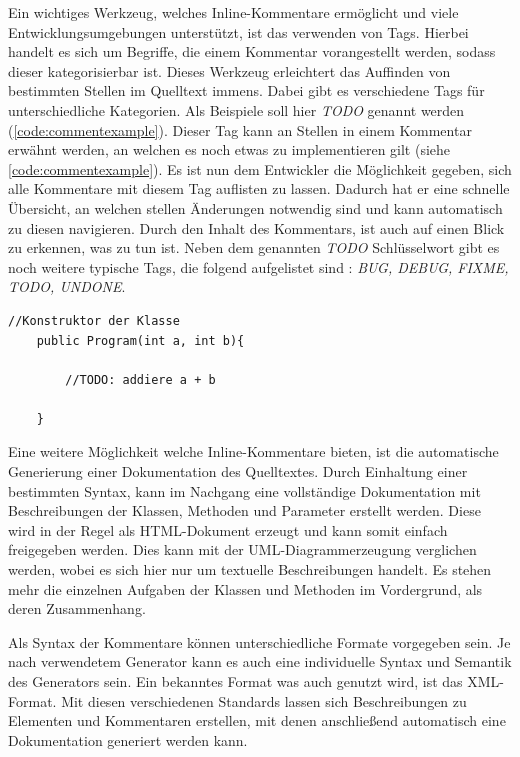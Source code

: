 Ein wichtiges Werkzeug, welches Inline-Kommentare ermöglicht und viele Entwicklungsumgebungen unterstützt, ist das verwenden von Tags. Hierbei handelt es sich um Begriffe, die einem Kommentar vorangestellt werden, sodass dieser kategorisierbar ist. Dieses Werkzeug erleichtert das Auffinden von bestimmten Stellen im Quelltext immens. Dabei gibt es verschiedene Tags für unterschiedliche Kategorien. Als Beispiele soll hier \textit{TODO} genannt werden (\autoref{code:commentexample}). Dieser Tag kann an Stellen in einem Kommentar erwähnt werden, an welchen es noch etwas zu implementieren gilt (siehe \autoref{code:commentexample}). Es ist nun dem Entwickler die Möglichkeit gegeben, sich alle Kommentare mit diesem Tag auflisten zu lassen. Dadurch hat er eine schnelle Übersicht, an welchen stellen Änderungen notwendig sind und kann automatisch zu diesen navigieren. Durch den Inhalt des Kommentars, ist auch auf einen Blick zu erkennen, was zu tun ist. 
Neben dem genannten \textit{TODO} Schlüsselwort gibt es noch weitere typische Tags, die folgend aufgelistet sind \cite{JillReinauer.2016}: \textit{BUG, DEBUG, FIXME, TODO, UNDONE}.
\begin{lstlisting}[caption={Beispiel von Inline-Kommentaren}, label=code:commentexample]
	//Konstruktor der Klasse 
	public Program(int a, int b){
		
		//TODO: addiere a + b
		
	}
\end{lstlisting}
\FloatBarrier
Eine weitere Möglichkeit welche Inline-Kommentare bieten, ist die automatische Generierung einer Dokumentation des Quelltextes. Durch Einhaltung einer bestimmten Syntax, kann im Nachgang eine vollständige Dokumentation mit Beschreibungen der Klassen, Methoden und Parameter erstellt werden. Diese wird in der Regel als HTML-Dokument erzeugt und kann somit einfach freigegeben werden. Dies kann mit der UML-Diagrammerzeugung verglichen werden, wobei es sich hier nur um textuelle Beschreibungen handelt. Es stehen mehr die einzelnen Aufgaben der Klassen und Methoden im Vordergrund, als deren Zusammenhang. 

Als Syntax der Kommentare können unterschiedliche Formate vorgegeben sein. Je nach verwendetem Generator kann es auch eine individuelle Syntax und Semantik des Generators sein. Ein bekanntes Format was auch genutzt wird, ist das XML-Format. Mit diesen verschiedenen Standards lassen sich Beschreibungen zu Elementen und Kommentaren erstellen, mit denen anschließend automatisch eine Dokumentation generiert werden kann. 

